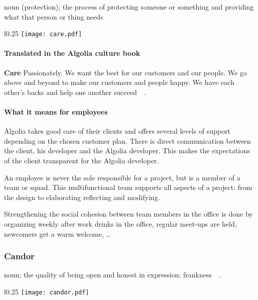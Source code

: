 \begin{definition}
noun (protection); the process of protecting someone or something and providing what that person or thing needs\cite{cambridge-care}
\end{definition}

\begin{wrapfigure}{l}{0.25\textwidth}
  \centering
  \texttt{[image: care.pdf]}
\end{wrapfigure}

\paragraph{Translated in the Algolia culture book}

\textbf{Care} Passionately. We want the best for our customers and our people. We go above and beyond to make our customers and people happy. We have each other's backs and help one another succeed~\cite{algolia-careers}~.

\paragraph{What it means for employees} 

Algolia takes good care of their clients and offers several levels of support depending on the chosen customer plan. There is direct communication between the client, his developer and the Algolia developer. This makes the expectations of the client transparent for the Algolia developer.

An employee is never the sole responsible for a project, but is a member of a team or squad. This multifunctional team supports all aspects of a project: from the design to elaborating reflecting and modifying.

Strengthening the social cohesion between team members in the office is done by organizing weekly after work drinks in the office, regular meet-ups are held, newcomers get a warm welcome, \dots

\subsubsection{Candor}
\label{ssub:candor}

\begin{definition}
noun; the quality of being open and honest in expression; frankness~\cite{oxford-candor}~.
\end{definition}

\begin{wrapfigure}{l}{0.25\textwidth}
  \centering
  \texttt{[image: candor.pdf]}
\end{wrapfigure}

